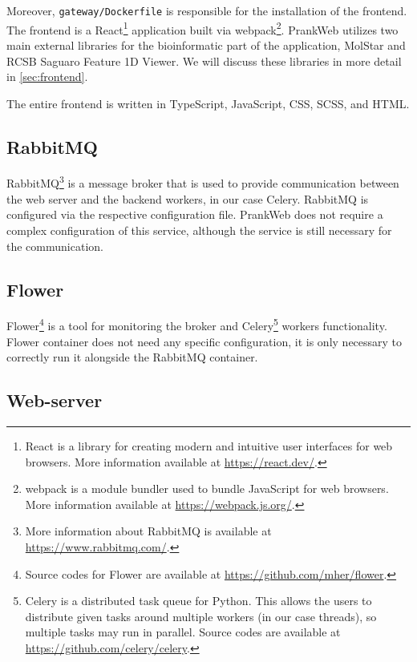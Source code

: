 Moreover, \texttt{gateway/Dockerfile} is responsible for the installation of the frontend. The frontend is a React\footnote{React is a library for creating modern and intuitive user interfaces for web browsers. More information available at \url{https://react.dev/}.} application built via webpack\footnote{webpack is a module bundler used to bundle JavaScript for web browsers. More information available at \url{https://webpack.js.org/}.}. PrankWeb utilizes two main external libraries for the bioinformatic part of the application, MolStar and RCSB Saguaro Feature 1D Viewer. We will discuss these libraries in more detail in \cref{sec:frontend}.

The entire frontend is written in TypeScript, JavaScript, CSS, SCSS, and HTML.

\subsection{RabbitMQ}
\label{subsec:rabbitmq}

RabbitMQ\footnote{More information about RabbitMQ is available at \url{https://www.rabbitmq.com/}.} is a message broker that is used to provide communication between the web server and the backend workers, in our case Celery. RabbitMQ is configured via the respective configuration file. PrankWeb does not require a complex configuration of this service, although the service is still necessary for the communication.

\subsection{Flower}
\label{subsec:flower}

Flower\footnote{Source codes for Flower are available at \url{https://github.com/mher/flower}.} is a tool for monitoring the broker and Celery\footnote{Celery is a distributed task queue for Python. This allows the users to distribute given tasks around multiple workers (in our case threads), so multiple tasks may run in parallel. Source codes are available at \url{https://github.com/celery/celery}.} workers functionality. Flower container does not need any specific configuration, it is only necessary to correctly run it alongside the RabbitMQ container.

\subsection{Web-server}
\label{subsec:web-server}

